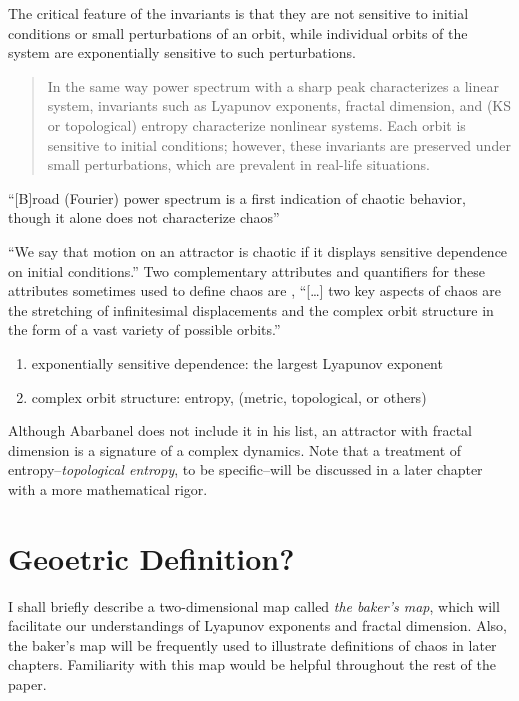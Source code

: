 \documentclass[12pt,twoside,draft]{book}
\begin{document}
The critical feature of the invariants is that they are not sensitive to initial conditions
or small perturbations of an orbit, while individual orbits of the system are exponentially
sensitive to such perturbations. \citep[p.1334]{abarbanel}

\begin{quote}
In the same way power spectrum with a sharp peak characterizes a linear system, invariants such as Lyapunov exponents, fractal dimension, and (KS or topological) entropy characterize nonlinear systems.
Each orbit is sensitive to initial conditions; however, these invariants are preserved under small perturbations, which are prevalent in real-life situations.
\end{quote}

``[B]road (Fourier) power spectrum is a first indication of chaotic behavior, though it alone does not characterize chaos''\citep[p.1338]{abarbanel}

``We say that motion on an attractor is chaotic if it displays sensitive dependence on initial conditions.'' \citep[p.11]{ott1994}
Two complementary attributes and quantifiers for these attributes sometimes used to define chaos are \citep[p.379]{abarbanel}, %
``[\ldots] two key aspects of chaos are the stretching of infinitesimal displacements and the complex orbit structure in the form of a vast variety of possible orbits.'' \citep[p.31]{ott1994}
\begin{enumerate}
  \item exponentially sensitive dependence: the largest Lyapunov exponent 
  \item complex orbit structure: entropy, (metric, topological, or others)
\end{enumerate}

Although Abarbanel does not include it in his list, an attractor with fractal dimension is a signature of a complex dynamics.
Note that a treatment of entropy--\textit{topological entropy}, to be specific--will be discussed in a later chapter with a more mathematical rigor.

\section{Geoetric Definition?}
I shall briefly describe a two-dimensional map called \textit{the baker's map}, which will facilitate our understandings of Lyapunov exponents and fractal dimension.
Also, the baker's map will be frequently used to illustrate definitions of chaos in later chapters.
Familiarity with this map would be helpful throughout the rest of the paper.
\end{document}
